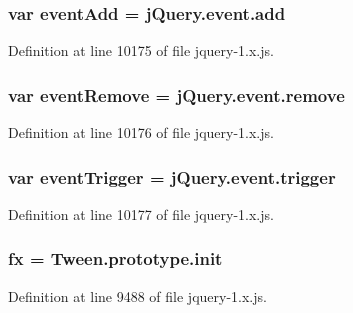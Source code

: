 \subsubsection[{\texorpdfstring{event\+Add}{eventAdd}}]{\setlength{\rightskip}{0pt plus 5cm}var event\+Add = {\bf j\+Query.\+event.\+add}}\hypertarget{jquery-1_8x_8js_a2ee2a279725f53d320bf9b116c5a179d}{}\label{jquery-1_8x_8js_a2ee2a279725f53d320bf9b116c5a179d}


Definition at line 10175 of file jquery-\/1.\+x.\+js.

\subsubsection[{\texorpdfstring{event\+Remove}{eventRemove}}]{\setlength{\rightskip}{0pt plus 5cm}var event\+Remove = {\bf j\+Query.\+event.\+remove}}\hypertarget{jquery-1_8x_8js_a818e9517d5b1b7b7e05391ea8ff1dfd5}{}\label{jquery-1_8x_8js_a818e9517d5b1b7b7e05391ea8ff1dfd5}


Definition at line 10176 of file jquery-\/1.\+x.\+js.

\subsubsection[{\texorpdfstring{event\+Trigger}{eventTrigger}}]{\setlength{\rightskip}{0pt plus 5cm}var event\+Trigger = {\bf j\+Query.\+event.\+trigger}}\hypertarget{jquery-1_8x_8js_a795caa3304cb75e9e688526722c89349}{}\label{jquery-1_8x_8js_a795caa3304cb75e9e688526722c89349}


Definition at line 10177 of file jquery-\/1.\+x.\+js.

\subsubsection[{\texorpdfstring{fx}{fx}}]{ fx = {\bf Tween.\+prototype.\+init}}\hypertarget{jquery-1_8x_8js_afbcf56cb9545c8bc885722b4fe4253ce}{}\label{jquery-1_8x_8js_afbcf56cb9545c8bc885722b4fe4253ce}


Definition at line 9488 of file jquery-\/1.\+x.\+js.

